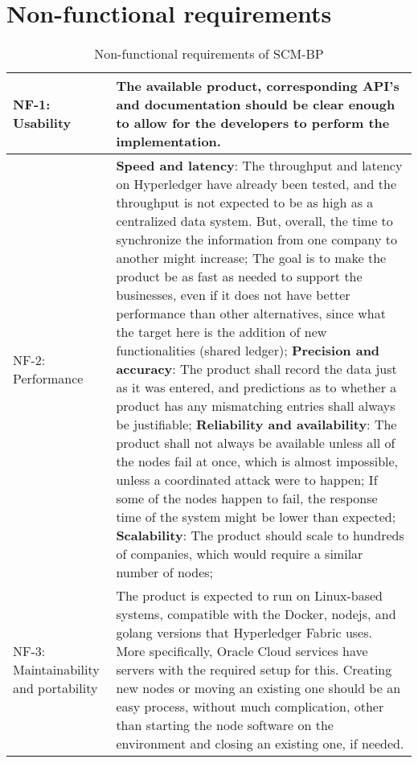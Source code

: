 \section{Non-functional requirements}{} %
\label{app:Non-functional}

\begin{table}[H]
\caption{Non-functional requirements of \ac{SCM-BP}}
\label{table:rnf}
\begin{tabular}{|p{3cm}|p{12cm}|}
\hline
NF-1: Usability & The available product, corresponding API's and documentation should be clear enough to allow for the developers to perform the implementation.\\
\hline
NF-2:  \newline Performance &  \textbf{Speed and latency}:  The throughput and latency on Hyperledger have already been tested, and the throughput is not expected to be as high as a centralized data system. But, overall, the time to synchronize the information from one company to another might increase; The goal is to make the product be as fast as needed to support the businesses, even if it does not have better performance than other alternatives, since what the target here is the addition of new functionalities (shared ledger); \newline
\textbf{Precision and accuracy}: The product shall record the data just as it was entered, and predictions as to whether a product has any mismatching entries shall always be justifiable; \newline
\textbf{Reliability and availability}: The product shall not always be available unless all of the nodes fail at once, which is almost impossible, unless a coordinated attack were to happen; If some of the nodes happen to fail, the response time of the system might be lower than expected; \newline
\textbf{Scalability}: The product should scale to hundreds of companies, which would require a similar number of nodes;
\\
\hline
NF-3:  \newline Maintainability and portability & The product is expected to run on Linux-based systems, compatible with the Docker, nodejs, and golang versions that Hyperledger Fabric uses. More specifically, Oracle Cloud services have servers with the required setup for this. Creating new nodes or moving an existing one should be an easy process, without much complication, other than starting the node software on the environment and closing an existing one, if needed. \\

\end{tabular}
\end{table}

